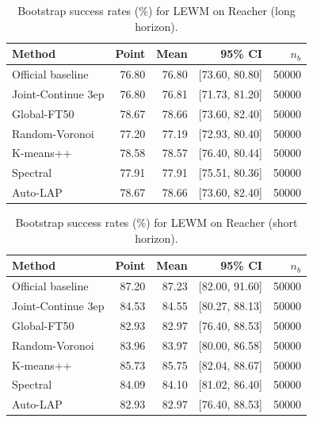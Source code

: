 \begin{table}[t]
\centering
\small
\caption{Bootstrap success rates (\%) for LEWM on Reacher (long horizon).}
\begin{tabular}{lrrrr}
\toprule
Method & Point & Mean & 95\% CI & $n_b$ \\
\midrule
Official baseline & 76.80 & 76.80 & [73.60, 80.80] & 50000 \\
Joint-Continue 3ep & 76.80 & 76.81 & [71.73, 81.20] & 50000 \\
Global-FT50 & 78.67 & 78.66 & [73.60, 82.40] & 50000 \\
Random-Voronoi & 77.20 & 77.19 & [72.93, 80.40] & 50000 \\
K-means++ & 78.58 & 78.57 & [76.40, 80.44] & 50000 \\
Spectral & 77.91 & 77.91 & [75.51, 80.36] & 50000 \\
Auto-LAP & 78.67 & 78.66 & [73.60, 82.40] & 50000 \\
\bottomrule
\end{tabular}
\end{table}

\begin{table}[t]
\centering
\small
\caption{Bootstrap success rates (\%) for LEWM on Reacher (short horizon).}
\begin{tabular}{lrrrr}
\toprule
Method & Point & Mean & 95\% CI & $n_b$ \\
\midrule
Official baseline & 87.20 & 87.23 & [82.00, 91.60] & 50000 \\
Joint-Continue 3ep & 84.53 & 84.55 & [80.27, 88.13] & 50000 \\
Global-FT50 & 82.93 & 82.97 & [76.40, 88.53] & 50000 \\
Random-Voronoi & 83.96 & 83.97 & [80.00, 86.58] & 50000 \\
K-means++ & 85.73 & 85.75 & [82.04, 88.67] & 50000 \\
Spectral & 84.09 & 84.10 & [81.02, 86.40] & 50000 \\
Auto-LAP & 82.93 & 82.97 & [76.40, 88.53] & 50000 \\
\bottomrule
\end{tabular}
\end{table}

